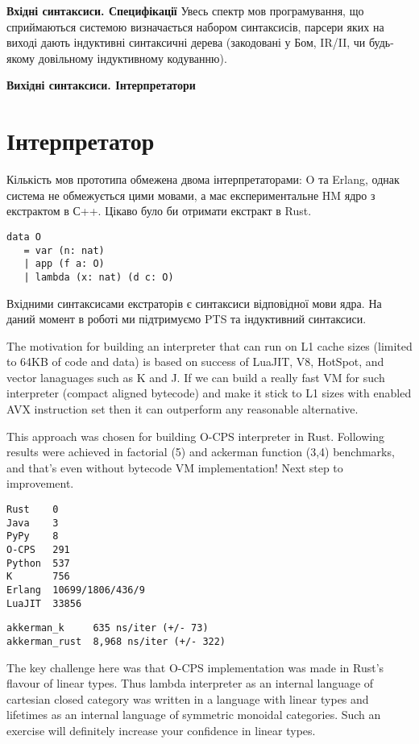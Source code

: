 {\bf Вхідні синтаксиси. Специфікації}
Увесь спектр мов програмування, що сприймаються системою визначається набором
синтаксисів, парсери яких на виході дають індуктивні синтаксичні дерева
(закодовані у Бом, IR/II, чи будь-якому довільному індуктивному кодуванню).

{\bf Вихідні синтаксиси. Інтерпретатори}

\section{Інтерпретатор}

Кількість мов прототипа обмежена двома інтерпретаторами: O та Erlang,
однак система не обмежується цими мовами, а має експериментальне HM ядро
з екстрактом в С++. Цікаво було би отримати екстракт в Rust.

\begin{lstlisting}[mathescape=true]
data O
   = var (n: nat)
   | app (f a: O)
   | lambda (x: nat) (d c: O)
\end{lstlisting}

Вхідними синтаксисами екстраторів є синтаксиси відповідної мови ядра.
На даний момент в роботі ми підтримуємо PTS та індуктивний синтаксиси.

The motivation for building an interpreter that can run on L1 cache
sizes (limited to 64KB of code and data) is based on success of LuaJIT,
V8, HotSpot, and vector lanaguages such as K and J. If we can build a
really fast VM for such interpreter (compact aligned bytecode) and
make it stick to L1 sizes with enabled AVX instruction set then it
can outperform any reasonable alternative.

This approach was chosen for building O-CPS interpreter in Rust.
Following results were achieved in factorial (5) and ackerman
function (3,4) benchmarks, and that's even without bytecode VM
implementation! Next step to improvement.

\begin{lstlisting}
Rust    0
Java    3
PyPy    8
O-CPS   291
Python  537
K       756
Erlang  10699/1806/436/9
LuaJIT  33856
\end{lstlisting}

\begin{lstlisting}
akkerman_k     635 ns/iter (+/- 73)
akkerman_rust  8,968 ns/iter (+/- 322)
\end{lstlisting}

The key challenge here was that O-CPS implementation was made
in Rust's flavour of linear types. Thus lambda interpreter as
an internal language of cartesian closed category was written
in a language with linear types and lifetimes as an internal
language of symmetric monoidal categories. Such an exercise
will definitely increase your confidence in linear types.

